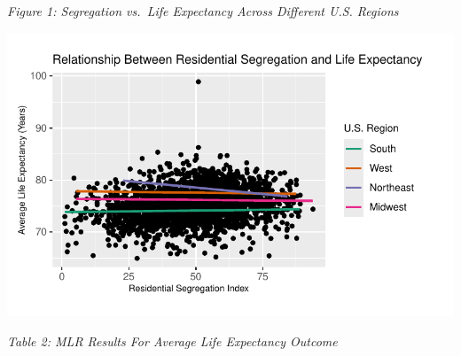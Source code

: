 \documentclass[
  10pt,
  letterpaper,
  DIV=11,
  numbers=noendperiod]{scrartcl}
\begin{document}
\emph{Figure 1: Segregation vs.~Life Expectancy Across Different U.S.
Regions}

\includegraphics{paper_files/figure-pdf/unnamed-chunk-10-1.pdf}

\emph{Table 2: MLR Results For Average Life Expectancy Outcome}
\end{document}
